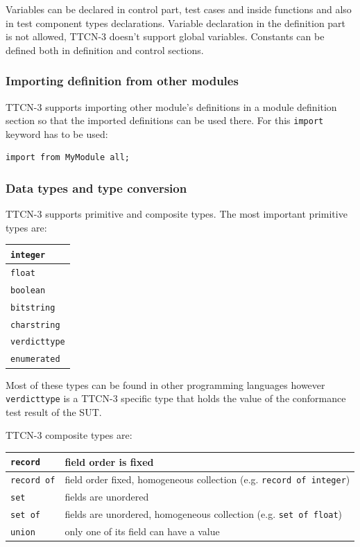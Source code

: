 \documentclass[a4paper]{article}
\begin{document}
Variables can be declared in control part, test cases and inside functions and also in test component types
declarations. Variable declaration in the definition part is not allowed, TTCN-3 doesn't support global variables.
Constants can be defined both in definition and control sections.

\subsubsection{Importing definition from other modules}
TTCN-3 supports importing other module's definitions in a module definition section so that the imported definitions
can be used there. For this \verb.import. keyword has to be used:
{\footnotesize
\begin{lstlisting}
import from MyModule all;
\end{lstlisting}
}

\subsubsection{Data types and type conversion}
TTCN-3 supports primitive and composite types.
The most important primitive types are:
{\footnotesize
\begin{center}
    \begin{tabular}{|l|}
        \hline
        \verb/integer/  \\
        \hline
        \verb/float/  \\
        \hline
        \verb/boolean/  \\
        \hline
        \verb/bitstring/  \\
        \hline
        \verb/charstring/  \\
        \hline
        \verb/verdicttype/  \\
        \hline
        \verb!enumerated!  \\
        \hline
    \end{tabular}
\end{center}
}

Most of these types can be found in other programming languages however \verb!verdicttype! is a TTCN-3
specific type that holds the value of the conformance test result of the SUT.

TTCN-3 composite types are:

{\footnotesize
\begin{center}
    \begin{tabular}{|l|l|}
        \hline
        \verb!record! & field order is fixed
        \\
        \hline
        \verb!record of! & field order fixed, homogeneous collection (e.g. \verb!record of integer!)
        \\
        \hline
        \verb!set! & fields are unordered
        \\
        \hline
        \verb!set of! & fields are unordered, homogeneous collection (e.g. \verb!set of float!)
        \\
        \hline
        \verb!union! & only one of its field can have a value
        \\
        \hline
    \end{tabular}
\end{center}
}
\end{document}

